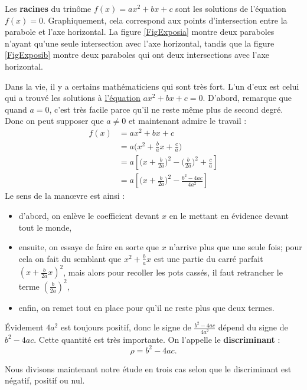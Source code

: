 \documentclass[a4paper,12pt]{book}
\theoremstyle{mes_exemples}	\newtheorem{exemple}[numtho]{Exemple}
\theoremstyle{mes_tho}
\newcommand{\defe}[2]{\textbf{#1}\index{#2}}
\begin{document}
Les \defe{racines}{Racine d'un trinôme} du trinôme $f(x)=ax^2+bx+c$ sont les solutions de l'équation $f(x)=0$. Graphiquement, cela correspond aux points d'intersection entre la parabole et l'axe horizontal. La figure \ref{FigExposia} montre deux paraboles n'ayant qu'une seule intersection avec l'axe horizontal, tandis que la figure \ref{FigExposib} montre deux paraboles qui ont deux intersections avec l'axe horizontal.


Dans la vie, il y a certains mathématiciens qui sont très fort. L'un d'eux est celui qui a trouvé les solutions à \href{http://fr.wikipedia.org/wiki/Équation_du_second_degré}{l'équation} $ax^2+bx+c=0$. D'abord, remarque que quand $a=0$, c'est très facile parce qu'il ne reste même plus de second degré. Donc on peut supposer que $a\neq 0$ et maintenant admire le travail :
\begin{subequations}
\begin{align}
f(x)	&=ax^2+bx+c\\
	&=a\Big( x^2+\frac{ b }{ a }x+\frac{ c }{ a } \Big)\\
	&=a\left[  \Big( x+\frac{ b }{ 2a } \Big)^2- \Big( \frac{ b }{ 2a } \Big)^2+\frac{ c }{ a }  \right]\\
	&=a\left[ \Big( x+\frac{ b }{ 2a } \Big)^2-\frac{ b^2-4ac }{ 4a^2 } \right]	\label{EqDernmispa}
\end{align}
\end{subequations}
Le sens de la man\oe vre est ainsi :
\begin{itemize}
\item d'abord, on enlève le coefficient devant $x$ en le mettant en évidence devant tout le monde,
\item ensuite, on essaye de faire en sorte que $x$ n'arrive plus que une seule fois; pour cela on fait du semblant que $x^2+\frac{ b }{ a }x$ est une partie du carré parfait $(x+\frac{ b }{ 2a }x)^2$, mais alors pour recoller les pots cassés, il faut retrancher le terme $\left( \frac{ b }{ 2a } \right)^2$,
\item enfin, on remet tout en place pour qu'il ne reste plus que deux termes.
\end{itemize}

Évidement $4a^2$ est toujours positif, donc le signe de $\frac{ b^2-4ac }{ 4a^2 }$ dépend du signe de $b^2-4ac$. Cette quantité est très importante. On l'appelle le \defe{discriminant}{Discriminant} :
\[ 
\rho=b^2-4ac.
\]

Nous divisons maintenant notre étude en trois cas selon que le discriminant est négatif, positif ou nul.
\end{document}
